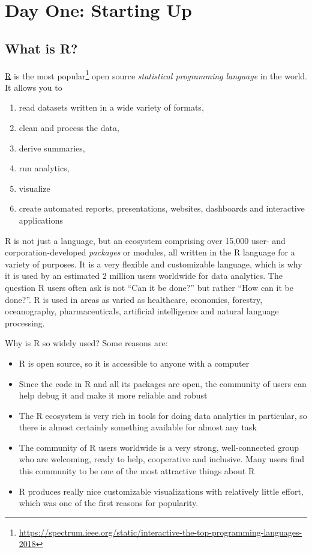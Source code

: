 \documentclass[12pt,letterpaperpaper,openany]{book}
\providecommand{\tightlist}{%
  \setlength{\itemsep}{0pt}\setlength{\parskip}{0pt}}
\let\rmarkdownfootnote\footnote%
\def\footnote{\protect\rmarkdownfootnote}
\begin{document}
\hypertarget{part-day-one-starting-up}{%
\part*{Day One: Starting Up}\label{part-day-one-starting-up}}

\hypertarget{what-is-r}{%
\chapter{What is R?}\label{what-is-r}}

\href{https://www.r-project.org}{R} is the
most popular\footnote{\url{https://spectrum.ieee.org/static/interactive-the-top-programming-languages-2018}} open source \emph{statistical programming language} in the world. It
allows you to

\begin{enumerate}
\def\labelenumi{\arabic{enumi}.}
\tightlist
\item
  read datasets written in a wide variety of formats,
\item
  clean and process the data,
\item
  derive summaries,
\item
  run analytics,
\item
  visualize
\item
  create automated reports, presentations, websites, dashboards and interactive applications
\end{enumerate}

R is not just a language, but an ecosystem comprising over 15,000 user- and corporation-developed
\emph{packages} or modules, all written in the R language for a variety of purposes. It is a very flexible and customizable language, which is why it is used by an estimated 2 million users worldwide for data analytics.
The question R users often ask is not ``Can it be done?'' but rather ``How can it be done?''. R is used
in areas as varied as healthcare, economics, forestry, oceanography, pharmaceuticals, artificial
intelligence and natural language processing.

Why is R so widely used? Some reasons are:

\begin{itemize}
\tightlist
\item
  R is open source, so it is accessible to anyone with a computer
\item
  Since the code in R and all its packages are open, the community of users can help debug it
  and make it more reliable and robust
\item
  The R ecosystem is very rich in tools for doing data analytics in particular, so there is almost
  certainly something available for almost any task
\item
  The community of R users worldwide is a very strong, well-connected group who are welcoming,
  ready to help, cooperative and inclusive. Many users find this community to be one of the most
  attractive things about R
\item
  R produces really nice customizable visualizations with relatively little effort, which was one of the
  first reasons for popularity.
\end{itemize}
\end{document}
